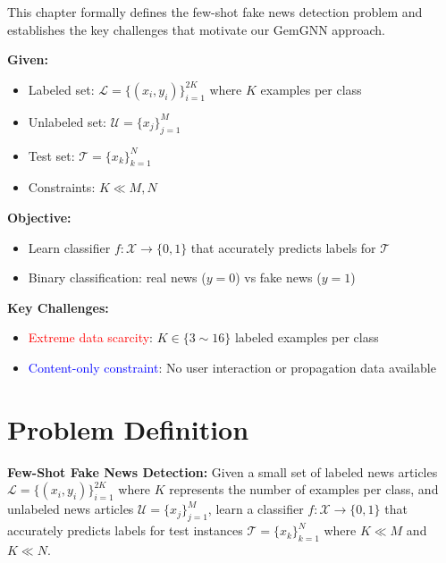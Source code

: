 
This chapter formally defines the few-shot fake news detection problem and establishes the key challenges that motivate our GemGNN approach.

\textbf{Given:}
\begin{itemize}
    \item Labeled set: $\mathcal{L} = \{(x_i, y_i)\}_{i=1}^{2K}$ where $K$ examples per class
    \item Unlabeled set: $\mathcal{U} = \{x_j\}_{j=1}^{M}$ 
    \item Test set: $\mathcal{T} = \{x_k\}_{k=1}^{N}$
    \item Constraints: $K \ll M, N$
\end{itemize}

\vspace{0.3cm}

\textbf{Objective:}
\begin{itemize}
    \item Learn classifier $f: \mathcal{X} \rightarrow \{0, 1\}$ that accurately predicts labels for $\mathcal{T}$
    \item Binary classification: real news ($y = 0$) vs fake news ($y = 1$)
\end{itemize}

\vspace{0.3cm}

\textbf{Key Challenges:}
\begin{itemize}
    \item \textcolor{red}{Extreme data scarcity}: $K \in \{3 \sim 16\}$ labeled examples per class
    \item \textcolor{blue}{Content-only constraint}: No user interaction or propagation data available
\end{itemize}

\section{Problem Definition}

\textbf{Few-Shot Fake News Detection:} Given a small set of labeled news articles $\mathcal{L} = \{(x_i, y_i)\}_{i=1}^{2K}$ where $K$ represents the number of examples per class, and unlabeled news articles $\mathcal{U} = \{x_j\}_{j=1}^{M}$, learn a classifier $f: \mathcal{X} \rightarrow \{0,1\}$ that accurately predicts labels for test instances $\mathcal{T} = \{x_k\}_{k=1}^{N}$ where $K \ll M$ and $K \ll N$.

